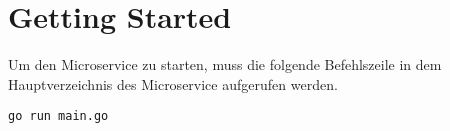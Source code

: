 \section{Getting Started}
\label{sec: Getting Started}
Um den Microservice zu starten, muss die folgende Befehlszeile in dem Hauptverzeichnis des Microservice aufgerufen werden.

\begin{lstlisting}[caption=Getting Started]
go run main.go
\end{lstlisting}
